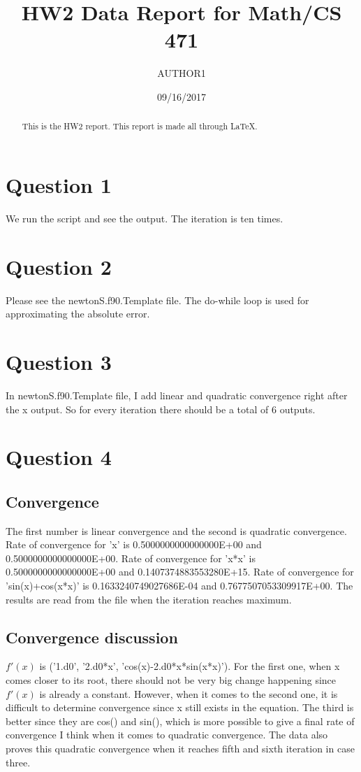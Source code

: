 \documentclass[12pt]{article}
\title{HW2 Data Report for Math/CS 471}
\author{AUTHOR1}
\date{09/16/2017}   %
\begin{document}
\maketitle

\begin{abstract}
This is the HW2 report. This report is made all through LaTeX.
\end{abstract}

\section{Question 1}
We run the script and see the output. The iteration is ten times.

\section{Question 2}
Please see the newtonS.f90.Template file. The do-while loop is used
for approximating the absolute error.

\section{Question 3}
In newtonS.f90.Template file, I add linear and quadratic convergence
right after the x output. So for every iteration there should be a
total of 6 outputs.

\section{Question 4}
\subsection{Convergence}
The first number is linear convergence and the second is quadratic
convergence.  
Rate of convergence for 'x' is 0.5000000000000000E+00 and
0.5000000000000000E+00.
Rate of convergence for 'x*x' is 0.5000000000000000E+00 and 
0.1407374883553280E+15. 
Rate of convergence for 'sin(x)+cos(x*x)' is 0.1633240749027686E-04 and
0.7677507053309917E+00.
The results are read from the file when the iteration reaches maximum.

\subsection{Convergence discussion}
$f'(x)$ is ('1.d0', '2.d0*x', 'cos(x)-2.d0*x*sin(x*x)'). 
For the first one, when x comes closer to its root, there should not
be very big change happening since $f'(x)$ is already a
constant. However, when it comes to the second one, it is difficult to
determine convergence since x still exists in the equation. The third
is better since they are cos() and sin(), which is more possible to give a
final rate of convergence I think when it comes to quadratic
convergence. The data also proves this quadratic convergence when it
reaches fifth and sixth iteration in case three.
\end{document}
